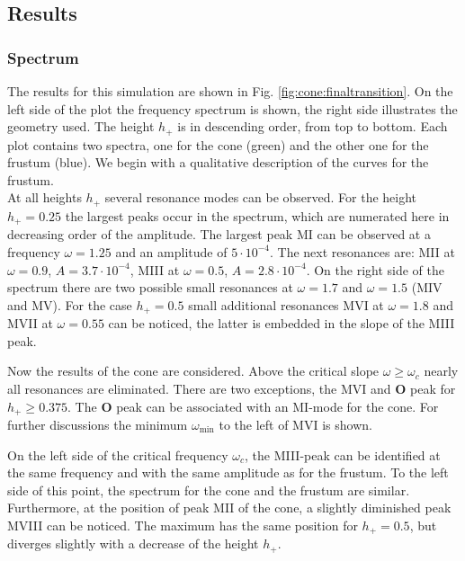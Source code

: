 \subsection{Results}%
\subsubsection{Spectrum}

The results for this simulation are shown in Fig. \ref{fig:cone:finaltransition}.
On the left side of the plot  the frequency spectrum is shown, the right side illustrates the geometry used.
The height $h_+$ is in descending order, from top to bottom.
Each plot contains two spectra, one for the cone (green)  and the other one for the frustum (blue).
We begin with a qualitative description of the curves for the frustum.\\
At all heights $h_+$ several resonance modes can be observed. For the height ${h_+=0.25}$
the largest peaks occur in the spectrum, which are numerated here in decreasing order of the amplitude.
The largest peak M\RN{1} can be observed at a frequency $\omega=1.25$ and an amplitude of $5\cdot10^{-4}$.
The next resonances are: M\RN{2} at $\omega=0.9$, $A=3.7\cdot10^{-4}$, M\RN{3} at $\omega=0.5$,  $A=2.8\cdot10^{-4}$.
On the right side of the spectrum there are two possible small resonances at $\omega=1.7$ and $\omega=1.5$ (M\RN{4} and M\RN{5}).
For the case $h_+=0.5$  small additional resonances  M\RN{6} at $\omega=1.8$ and M\RN{7} at $\omega=0.55$ can be noticed,
the latter is embedded in the slope of the M\RN{3} peak.

Now the results of the cone are considered.
Above the critical slope $\omega\geq\omega_c$ nearly all resonances are eliminated.
There are  two exceptions, the M\RN{6} and \textbf{O} peak for $h_+\geq0.375$.
The \textbf{O} peak can be associated with an M\RN{1}-mode for the cone.
For further discussions the minimum $\omega_{\text{min}}$ to the left of M\RN{6} is shown.

On the left side of the critical frequency $\omega_c$,  the M\RN{3}-peak can be identified
at the same frequency and with the same amplitude as for the frustum. To the left side of this point, the spectrum for
the cone and the frustum are similar.
Furthermore, at the position of peak M\RN{2} of the cone, a slightly diminished peak M\RN{8} can be noticed.
The maximum has the same position for $h_+=0.5$, but diverges slightly with a decrease of the height $h_+$.

